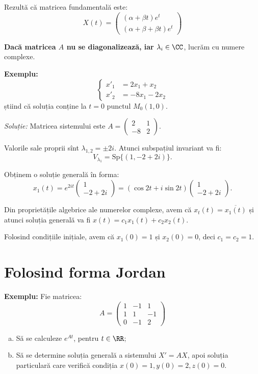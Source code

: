 Rezultă că matricea fundamentală este:
\[
  X(t) = \begin{pmatrix}
    (\alpha + \beta t) e^t \\
    (\alpha + \beta + \beta t) e^t
  \end{pmatrix}
\]

\vspace{0.5cm}

\textbf{Dacă matricea $A$ nu se diagonalizează, iar $\lambda_i \in \CC$}, lucrăm cu numere complexe.

\textbf{Exemplu:}
\[
  \begin{cases}
    x'_1 &= 2x_1 + x_2 \\
    x'_2 &= -8x_1 - 2x_2
  \end{cases}
\]
știind că soluția conține la $t = 0$ punctul $M_0(1, 0)$.

\emph{Soluție:} Matricea sistemului este $A = \begin{pmatrix} 2 & 1 \\ -8 & 2 \end{pmatrix}$.

Valorile sale proprii sînt $\lambda_{1,2} = \pm 2i$. Atunci subspațiul invariant va fi:
\[
  V_{\lambda_1} = \mathrm{Sp} \{(1, -2 + 2i )\}.
\]

Obținem o soluție generală în forma:
\[
  x_1(t) = e^{2it} \begin{pmatrix} 1 \\ -2 + 2i \end{pmatrix} = %
  (\cos 2t + i \sin 2t) \begin{pmatrix} 1 \\ -2 + 2i \end{pmatrix}.
\]

Din proprietățile algebrice ale numerelor complexe, avem că $x_t(t) = \overline{x_1(t)}$ și atunci
soluția generală va fi $x(t) = c_1 x_1(t) + c_2 x_2(t)$.

Folosind condițiile inițiale, avem că $x_1(0) = 1$ și $x_2(0) = 0$, deci $c_1 = c_2 = 1$.


\section{Folosind forma Jordan}
\label{sec:jordan}

\textbf{Exemplu:} Fie matricea:
\[
  A = \begin{pmatrix}
    1 & -1 & 1 \\
    1 & 1 & -1 \\
    0 & -1 & 2 
  \end{pmatrix}
\]
\begin{enumerate}[(a)]
\item Să se calculeze $e^{At}$, pentru $t \in \RR$;
\item Să se determine soluția generală a sistemului $X' = AX$, apoi soluția particulară
  care verifică condiția $x(0) = 1, y(0) = 2, z(0) = 0$.
\end{enumerate}

